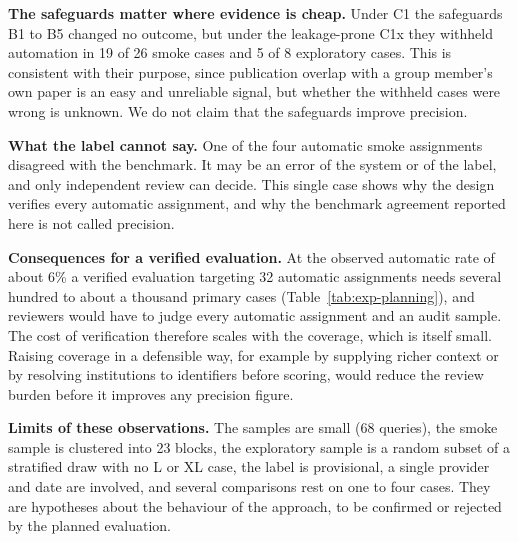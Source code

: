 \textbf{The safeguards matter where evidence is cheap.} Under C1 the safeguards B1 to B5 changed no outcome, but under the leakage-prone C1x they withheld automation in 19 of 26 smoke cases and 5 of 8 exploratory cases. This is consistent with their purpose, since publication overlap with a group member's own paper is an easy and unreliable signal, but whether the withheld cases were wrong is unknown. We do not claim that the safeguards improve precision.

\textbf{What the label cannot say.} One of the four automatic smoke assignments disagreed with the benchmark. It may be an error of the system or of the label, and only independent review can decide. This single case shows why the design verifies every automatic assignment, and why the benchmark agreement reported here is not called precision.

\textbf{Consequences for a verified evaluation.} At the observed automatic rate of about 6\% a verified evaluation targeting 32 automatic assignments needs several hundred to about a thousand primary cases (Table~\ref{tab:exp-planning}), and reviewers would have to judge every automatic assignment and an audit sample. The cost of verification therefore scales with the coverage, which is itself small. Raising coverage in a defensible way, for example by supplying richer context or by resolving institutions to identifiers before scoring, would reduce the review burden before it improves any precision figure.

\textbf{Limits of these observations.} The samples are small (68 queries), the smoke sample is clustered into 23 blocks, the exploratory sample is a random subset of a stratified draw with no L or XL case, the label is provisional, a single provider and date are involved, and several comparisons rest on one to four cases. They are hypotheses about the behaviour of the approach, to be confirmed or rejected by the planned evaluation.
